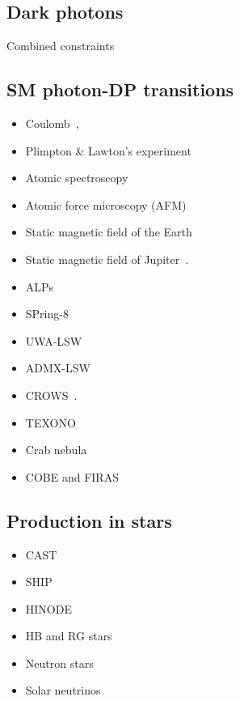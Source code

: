 \documentclass[9pt,twocolumn]{extarticle}
\begin{document}
\begin{mdframed}
\section{Dark photons}\vspace{-0.5em}
Combined constraints~\cite{Caputo:2021eaa}
\subsection*{SM photon-DP transitions}\vspace{-0.5em}
\begin{itemize}\setlength\itemsep{-0.5em}
\item Coulomb~\cite{Goldhaber:2008xy,Williams:1971ms,Bartlett:1988yy,Tu:2005ge,Kroff:2020zhp},
\item Plimpton \& Lawton's experiment~\cite{Plimpton:1936ont,Kroff:2020zhp}
\item Atomic spectroscopy~\cite{Jaeckel:2010xx}
\item Atomic force microscopy (AFM)~\cite{Kroff:2020zhp}
\item Static magnetic field of the Earth~\cite{Goldhaber:1971mr,Fischbach:1994ir,Marocco:2021dku}
\item Static magnetic field of Jupiter~\cite{Davis:1975mn,Marocco:2021dku}. 
\item ALPs~\cite{Ehret:2010mh}
\item SPring-8~\cite{Inada:2013tx}
\item UWA-LSW~\cite{Povey:2010hs,Parker:2013fxa}
\item ADMX-LSW~\cite{Wagner:2010mi}
\item CROWS~\cite{Betz:2013dza}.
\item TEXONO~\cite{Danilov:2018bks}
\item Crab nebula~\cite{Zechlin:2008tj}
\item COBE and FIRAS~\cite{Caputo:2020bdy}
\end{itemize}

\subsection*{Production in stars}\vspace{-0.5em}
\begin{itemize}\setlength\itemsep{-0.5em}
\item CAST~\cite{Redondo:2008aa}
\item SHIP~\cite{Schwarz:2015lqa} 
\item HINODE~\cite{Frerick:2022mjg}
\item HB and RG stars~\cite{Redondo:2013lna}
\item Neutron stars~\cite{Hong:2020bxo}
\item Solar neutrinos~\cite{Vinyoles:2015aba}
\end{itemize}


\end{mdframed}
\end{document}
